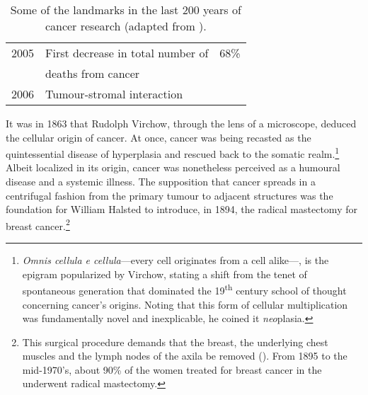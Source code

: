 \begin{table}[ht]
\begin{tabular}{lm{6.5cm}m{1.5cm}}
    2005 & First decrease in total number of                              & 68\%                          \\
         & deaths from cancer                                             &                               \\
    2006 & Tumour-stromal interaction                                     &                               \\
    \bottomrule
  \end{tabular}
  \caption[Landmarks of 200 years of cancer research]{Some of the landmarks in the last 200 years of cancer research
    (adapted from \citealp{devita_two_2012}).}
  \label{tab:200years}
\end{table}

It was in 1863 that Rudolph Virchow, through the lens of a microscope, deduced
the cellular origin of cancer.\cite{virchow_cellular_1863} At once, cancer was
being recasted as the quintessential disease of hyperplasia and rescued back to
the somatic realm.\footnote{\emph{Omnis cellula e cellula}---every cell
  originates from a cell alike---, is the epigram popularized by Virchow,
  stating a shift from the tenet of spontaneous generation that dominated the
  19\textsuperscript{th} century school of thought concerning cancer's origins.
  Noting that this form of cellular multiplication was fundamentally novel and
  inexplicable, he coined it \emph{neo}plasia.}  Albeit localized in its origin,
cancer was nonetheless perceived as a humoural disease and a systemic illness.
The supposition that cancer spreads in a centrifugal fashion from the primary
tumour to adjacent structures was the foundation for William Halsted to
introduce, in 1894, the radical mastectomy for breast cancer.\footnote{This
  surgical procedure demands that the breast, the underlying chest muscles and
  the lymph nodes of the axila be removed (\citealp{halsted_i._1894}).  From
  1895 to the mid-1970's, about 90\% of the women treated for breast cancer in
  the  underwent radical mastectomy.}

